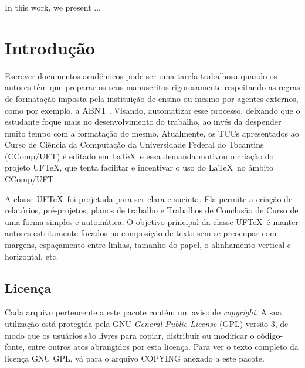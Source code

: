 \documentclass[report]{uftex}
\newcommand\uftex{UF\TeX}
\begin{document}
  \begin{foreignabstract}
  In this work, we present ...
  \end{foreignabstract}
  \printlosymbols  
  \printloabbreviations
  \tableofcontents %
\mainmatter
\onehalfspacing
\chapter{Introdução}
\label{sec:introducao}
\noindent Escrever documentos acadêmicos pode ser uma tarefa trabalhosa quando os autores têm que preparar os seus manuscritos rigorosamente respeitando as regras de formatação imposta pela instituição de ensino ou mesmo por agentes externos, como por exemplo, a ABNT . Visando, automatizar esse processo, deixando que o estudante foque mais no desenvolvimento do trabalho, ao invés da despender muito tempo com a formatação do mesmo. Atualmente, os TCCs apresentados ao Curso de Ciência da Computação da Universidade Federal do Tocantins (CComp/UFT) é editado em \LaTeX\, e essa demanda motivou o criação do projeto \uftex, que tenta facilitar e incentivar o uso do \LaTeX\ no âmbito CComp/UFT. \cite{JW82}

A classe \uftex\ foi projetada para ser clara e sucinta. Ela permite a criação de relatórios, pré-projetos, planos de trabalho e Trabalhos de Conclusão de Curso de uma forma simples e automática. O objetivo principal da classe \uftex\ é manter autores estritamente focados na composição de texto sem se preocupar com margens, espaçamento entre linhas, tamanho do papel, o alinhamento vertical e horizontal, etc.

\section{Licença}
\label{sec:Licenca}
\noindent Cada arquivo pertencente a este pacote contém um aviso de \emph{copyright}. A sua utilização está protegida pela GNU \emph{General Public License} (GPL) versão 3, de modo que os usuários são livres para copiar, distribuir ou modificar o código-fonte, entre outros atos abrangidos por esta licença. Para ver o texto completo da licença GNU GPL, vá para o arquivo COPYING anexado a este pacote. 
\end{document}
